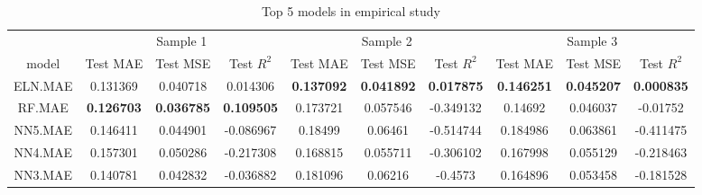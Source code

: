 \begin{table}

\caption{\label{tab:}Top 5 models in empirical study}
\centering
\fontsize{6}{8}\selectfont
\begin{tabular}[t]{cccccccccc}
\toprule
\multicolumn{1}{c}{ } & \multicolumn{3}{c}{Sample 1} & \multicolumn{3}{c}{Sample 2} & \multicolumn{3}{c}{Sample 3} \\
\cmidrule(l{3pt}r{3pt}){2-4} \cmidrule(l{3pt}r{3pt}){5-7} \cmidrule(l{3pt}r{3pt}){8-10}
model & Test MAE & Test MSE & Test $R^2$ & Test MAE & Test MSE & Test $R^2$ & Test MAE & Test MSE & Test $R^2$\\
\midrule
ELN.MAE & 0.131369 & 0.040718 & 0.014306 & \textbf{0.137092} & \textbf{0.041892} & \textbf{0.017875} & \textbf{0.146251} & \textbf{0.045207} & \textbf{0.000835}\\
RF.MAE & \textbf{0.126703} & \textbf{0.036785} & \textbf{0.109505} & 0.173721 & 0.057546 & -0.349132 & 0.14692 & 0.046037 & -0.01752\\
NN5.MAE & 0.146411 & 0.044901 & -0.086967 & 0.18499 & 0.06461 & -0.514744 & 0.184986 & 0.063861 & -0.411475\\
NN4.MAE & 0.157301 & 0.050286 & -0.217308 & 0.168815 & 0.055711 & -0.306102 & 0.167998 & 0.055129 & -0.218463\\
NN3.MAE & 0.140781 & 0.042832 & -0.036882 & 0.181096 & 0.06216 & -0.4573 & 0.164896 & 0.053458 & -0.181528\\
\bottomrule
\end{tabular}
\end{table}